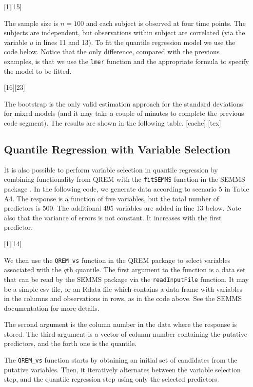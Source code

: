 \documentclass[a4paper,10pt]{article}
\begin{document}
[1][15]

The sample size is $n=100$ and each subject is observed at four time points. The subjects are independent, but observations within subject are correlated (via the variable $u$ in lines 11 and 13).
To fit the quantile regression model we use the code below. Notice that the only difference, compared with the previous examples, is that we use the \texttt{lmer} function and the appropriate formula to specify the model to be fitted.

[16][23]

The bootstrap is the only valid estimation approach for the standard deviations for mixed models (and it may take a couple of minutes to complete the previous code segment). The results are shown in the following table.
[cache]
 [tex]	

\subsection{Quantile Regression with Variable Selection}
It is also possible to perform variable selection in quantile regression by combining functionality from QREM with the \texttt{fitSEMMS} function in the SEMMS package \cite{SEMMS}. In the following code, we generate data according to scenario 5 in Table A4. The response is a function of five variables, but the total number of predictors is 500. The additional 495 variables are added in line 13 below. Note also that the variance of errors is not constant. It increases with the first predictor.

[1][14]

We then use the \texttt{QREM\_vs} function in the QREM package to select variables associated with the $q$th quantile.
The first argument to the function is a data set that can be read by the SEMMS package via the \texttt{readInputFile} function. It may be a simple csv file, or an Rdata file which contains a data frame with variables in the columns and observations in rows, as in the code above. See the SEMMS documentation for more details.

The second argument is the column number in the data where the response is stored. The third argument is a vector of column number containing the putative predictors, and the forth one is the quantile.

The \texttt{QREM\_vs} function starts by obtaining an initial set of candidates from the putative variables. Then, it iteratively alternates between the variable selection step, and the quantile regression step using only the selected predictors.
\end{document}
